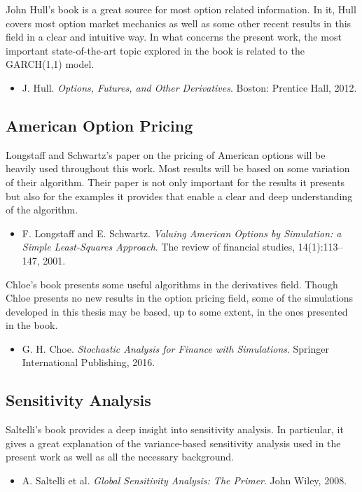 \documentclass[a4paper,twocolumn,aps,prd,longbibliography,superscriptaddress]{revtex4-1}
\begin{document}
John Hull's book is a great source for most option related information. In it, Hull covers most option market mechanics as well as some other recent results in this field in a clear and intuitive way.
In what concerns the present work, the most important state-of-the-art topic explored in the book is related to the GARCH(1,1) model.
\begin{itemize}
\item J. Hull. \textit{Options, Futures, and Other Derivatives}. Boston: Prentice Hall, 2012.
\end{itemize}

\subsection{American Option Pricing}
Longstaff and Schwartz's paper on the pricing of American options will be heavily used throughout this work. Most results will be based on some variation of their algorithm. Their paper is not only important for the results it presents but also for the examples it provides that enable a clear and deep understanding of the algorithm.
\begin{itemize}
\item  F. Longstaff and E. Schwartz. \textit{Valuing American Options by Simulation: a Simple Least-Squares Approach}. The review of financial studies, 14(1):113–147, 2001.
\end{itemize}

Chloe's book presents some useful algorithms in the derivatives field. Though Chloe presents no new results in the option pricing field, some of the simulations developed in this thesis may be based, up to some extent, in the ones presented in the book.
\begin{itemize}
\item G. H. Choe. \textit{Stochastic Analysis for Finance with Simulations}. Springer International Publishing, 2016.
\end{itemize}

\subsection{Sensitivity Analysis}
Saltelli's book provides a deep insight into sensitivity analysis. In particular, it gives a great explanation of the variance-based sensitivity analysis used in the present work as well as all the necessary background.
\begin{itemize}
\item A. Saltelli et al. \textit{Global Sensitivity Analysis: The Primer}. John Wiley, 2008.
\end{itemize}
\end{document}
